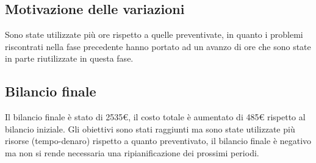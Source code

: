 \subsection{Motivazione delle variazioni}
Sono state utilizzate più ore rispetto a quelle preventivate, in quanto i problemi riscontrati nella fase precedente hanno portato ad un avanzo di ore che sono state in parte riutilizzate in questa fase.

\subsection{Bilancio finale}
Il bilancio finale è stato di 2535€, il costo totale è aumentato di 485€ rispetto al bilancio iniziale. Gli obiettivi sono stati raggiunti ma sono state utilizzate più risorse (tempo-denaro) rispetto a quanto preventivato, il bilancio finale è negativo ma non si rende necessaria una ripianificazione dei prossimi periodi.

